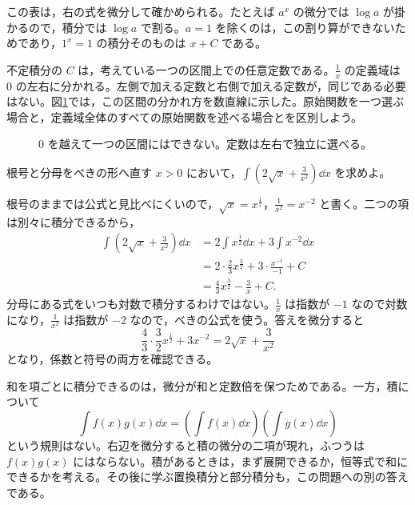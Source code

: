 この表は，右の式を微分して確かめられる。たとえば $a^x$ の微分では $\log a$ が掛かるので，積分では $\log a$ で割る。$a=1$ を除くのは，この割り算ができないためであり，$1^x=1$ の積分そのものは $x+C$ である。

不定積分の $C$ は，考えている一つの区間上での任意定数である。$\frac1x$ の定義域は $0$ の左右に分かれる。左側で加える定数と右側で加える定数が，同じである必要はない。図\ref{図:対数の区間}では，この区間の分かれ方を数直線に示した。原始関数を一つ選ぶ場合と，定義域全体のすべての原始関数を述べる場合とを区別しよう。

\begin{figure}[htbp]
 \centering
 \caption{$0$ を越えて一つの区間にはできない。定数は左右で独立に選べる。}
 \label{図:対数の区間}
\end{figure}

\begin{example}{根号と分母をべきの形へ直す}
$x>0$ において，$\int\left(2\sqrt{x}+\frac3{x^2}\right)\dd x$ を求めよ。
\end{example}

根号のままでは公式と見比べにくいので，$\sqrt{x}=x^{\frac12}$，$\frac1{x^2}=x^{-2}$ と書く。二つの項は別々に積分できるから，
\[
\begin{aligned}
 \int\left(2\sqrt{x}+\frac3{x^2}\right)\dd x
 &=2\int x^{\frac12}\dd x+3\int x^{-2}\dd x\\
 &=2\cdot\frac23x^{\frac32}
   +3\cdot\frac{x^{-1}}{-1}+C\\
 &=\frac43x^{\frac32}-\frac3x+C.
\end{aligned}
\]
分母にある式をいつも対数で積分するわけではない。$\frac1x$ は指数が $-1$ なので対数になり，$\frac1{x^2}$ は指数が $-2$ なので，べきの公式を使う。答えを微分すると
\[
 \frac43\cdot\frac32x^{\frac12}
 +3x^{-2}=2\sqrt{x}+\frac3{x^2}
\]
となり，係数と符号の両方を確認できる。

和を項ごとに積分できるのは，微分が和と定数倍を保つためである。一方，積について
\[
 \int f(x)g(x)\dd x
 =\left(\int f(x)\dd x\right)
  \left(\int g(x)\dd x\right)
\]
という規則はない。右辺を微分すると積の微分の二項が現れ，ふつうは $f(x)g(x)$ にはならない。積があるときは，まず展開できるか，恒等式で和にできるかを考える。その後に学ぶ置換積分と部分積分も，この問題への別の答えである。

